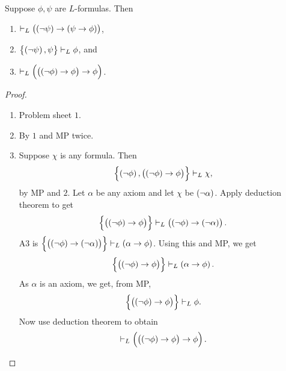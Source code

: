 \begin{proposition}
\label{prop:1.2.7}
Suppose $ \phi, \psi $ are $ L $-formulas. Then
\begin{enumerate}
\item $ \vdash_L \impb{\notb{\psi}}{\impb{\psi}{\phi}} $,
\item $ \cbr{\notb{\psi}, \psi} \vdash_L \phi $, and
\item $ \vdash_L \impb{\impb{\notb{\phi}}{\phi}}{\phi} $.
\end{enumerate}
\end{proposition}

\begin{proof}
\hfill
\begin{enumerate}
\item Problem sheet $ 1 $.
\item By $ 1 $ and MP twice.
\item Suppose $ \chi $ is any formula. Then
$$ \cbr{\notb{\phi}, \impb{\notb{\phi}}{\phi}} \vdash_L \chi, $$
by MP and $ 2 $. Let $ \alpha $ be any axiom and let $ \chi $ be $ \notb{\alpha} $. Apply deduction theorem to get
$$ \cbr{\impb{\notb{\phi}}{\phi}} \vdash_L \impb{\notb{\phi}}{\notb{\alpha}}. $$
A3 is $ \cbr{\impb{\notb{\phi}}{\notb{\alpha}}} \vdash_L \impb{\alpha}{\phi} $. Using this and MP, we get
$$ \cbr{\impb{\notb{\phi}}{\phi}} \vdash_L \impb{\alpha}{\phi}. $$
As $ \alpha $ is an axiom, we get, from MP,
$$ \cbr{\impb{\notb{\phi}}{\phi}} \vdash_L \phi. $$
Now use deduction theorem to obtain
$$ \vdash_L \impb{\impb{\notb{\phi}}{\phi}}{\phi}. $$
\end{enumerate}
\end{proof}

\pagebreak

